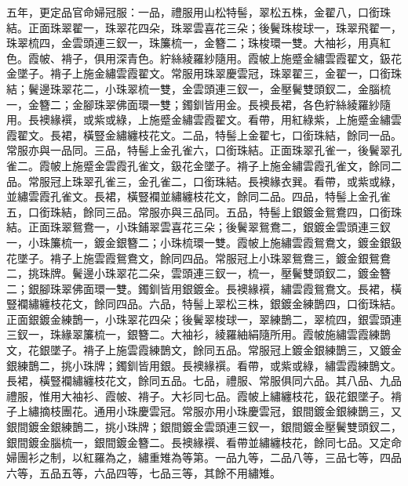 五年，更定品官命婦冠服：一品，禮服用山松特髻，翠松五株，金翟八，口銜珠結。正面珠翠翟一，珠翠花四朵，珠翠雲喜花三朵；後鬢珠梭球一，珠翠飛翟一，珠翠梳四，金雲頭連三釵一，珠簾梳一，金簪二；珠梭環一雙。大袖衫，用真紅色。霞帔、褙子，俱用深青色。紵絲綾羅紗隨用。霞帔上施蹙金繡雲霞翟文，鈒花金墜子。褙子上施金繡雲霞翟文。常服用珠翠慶雲冠，珠翠翟三，金翟一，口銜珠結；鬢邊珠翠花二，小珠翠梳一雙，金雲頭連三釵一，金壓鬢雙頭釵二，金腦梳一，金簪二；金腳珠翠佛面環一雙；鐲釧皆用金。長襖長裙，各色紵絲綾羅紗隨用。長襖緣襈，或紫或綠，上施蹙金繡雲霞翟文。看帶，用紅綠紫，上施蹙金繡雲霞翟文。長裙，橫豎金繡纏枝花文。二品，特髻上金翟七，口銜珠結，餘同一品。常服亦與一品同。三品，特髻上金孔雀六，口銜珠結。正面珠翠孔雀一，後鬢翠孔雀二。霞帔上施蹙金雲霞孔雀文，鈒花金墜子。褙子上施金繡雲霞孔雀文，餘同二品。常服冠上珠翠孔雀三，金孔雀二，口銜珠結。長襖緣衣巽。看帶，或紫或綠，並繡雲霞孔雀文。長裙，橫豎襴並繡纏枝花文，餘同二品。四品，特髻上金孔雀五，口銜珠結，餘同三品。常服亦與三品同。五品，特髻上銀鍍金鴛鴦四，口銜珠結。正面珠翠鴛鴦一，小珠鋪翠雲喜花三朵；後鬢翠鴛鴦二，銀鍍金雲頭連三釵一，小珠簾梳一，鍍金銀簪二；小珠梳環一雙。霞帔上施繡雲霞鴛鴦文，鍍金銀鈒花墜子。褙子上施雲霞鴛鴦文，餘同四品。常服冠上小珠翠鴛鴦三，鍍金銀鴛鴦二，挑珠牌。鬢邊小珠翠花二朵，雲頭連三釵一，梳一，壓鬢雙頭釵二，鍍金簪二；銀腳珠翠佛面環一雙。鐲釧皆用銀鍍金。長襖緣襈，繡雲霞鴛鴦文。長裙，橫豎襴繡纏枝花文，餘同四品。六品，特髻上翠松三株，銀鍍金練鵲四，口銜珠結。正面銀鍍金練鵲一，小珠翠花四朵；後鬢翠梭球一，翠練鵲二，翠梳四，銀雲頭連三釵一，珠緣翠簾梳一，銀簪二。大袖衫，綾羅紬絹隨所用。霞帔施繡雲霞練鵲文，花銀墜子。褙子上施雲霞練鵲文，餘同五品。常服冠上鍍金銀練鵲三，又鍍金銀練鵲二，挑小珠牌；鐲釧皆用銀。長襖緣襈。看帶，或紫或綠，繡雲霞練鵲文。長裙，橫豎襴繡纏枝花文，餘同五品。七品，禮服、常服俱同六品。其八品、九品禮服，惟用大袖衫、霞帔、褙子。大衫同七品。霞帔上繡纏枝花，鈒花銀墜子。褙子上繡摘枝團花。通用小珠慶雲冠。常服亦用小珠慶雲冠，銀間鍍金銀練鵲三，又銀間鍍金銀練鵲二，挑小珠牌；銀間鍍金雲頭連三釵一，銀間鍍金壓鬢雙頭釵二，銀間鍍金腦梳一，銀間鍍金簪二。長襖緣襈、看帶並繡纏枝花，餘同七品。又定命婦團衫之制，以紅羅為之，繡重雉為等第。一品九等，二品八等，三品七等，四品六等，五品五等，六品四等，七品三等，其餘不用繡雉。

